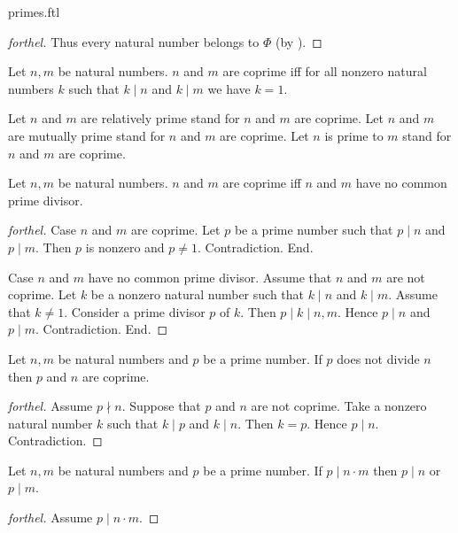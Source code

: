 \documentclass{naproche-library}
\begin{document}
\begin{smodule}{primes.ftl}
\begin{proof}[forthel]
    Thus every natural number belongs to $\Phi$ (by ).
  \end{proof}

  \begin{definition}[forthel,id=ARITHMETIC_10_463197419077632,printid]
    Let $n, m$ be natural numbers.
    $n$ and $m$ are coprime iff for all nonzero natural numbers $k$ such that $k \mid n$ and $k \mid m$ we have $k = 1$.

    Let $n$ and $m$ are relatively prime stand for $n$ and $m$ are coprime.
    Let $n$ and $m$ are mutually prime stand for $n$ and $m$ are coprime.
    Let $n$ is prime to $m$ stand for $n$ and $m$ are coprime.
  \end{definition}

  \begin{proposition}[forthel,id=ARITHMETIC_10_5776394594287616,printid]
    Let $n, m$ be natural numbers.
    $n$ and $m$ are coprime iff $n$ and $m$ have no common prime divisor.
  \end{proposition}
  \begin{proof}[forthel]
    Case $n$ and $m$ are coprime.
      Let $p$ be a prime number such that $p \mid n$ and $p \mid m$.
      Then $p$ is nonzero and $p \neq 1$.
      Contradiction.
    End.

    Case $n$ and $m$ have no common prime divisor.
      Assume that $n$ and $m$ are not coprime.
      Let $k$ be a nonzero natural number such that $k \mid n$ and $k \mid m$.
      Assume that $k \neq 1$.
      Consider a prime divisor $p$ of $k$.
      Then $p \mid k \mid n,m$.
      Hence $p \mid n$ and $p \mid m$.
      Contradiction.
    End.
  \end{proof}

  \begin{proposition}[forthel,id=ARITHMETIC_10_7212152851005440,printid]
    Let $n, m$ be natural numbers and $p$ be a prime number.
    If $p$ does not divide $n$ then $p$ and $n$ are coprime.
  \end{proposition}
  \begin{proof}[forthel]
    Assume $p \nmid n$.
    Suppose that $p$ and $n$ are not coprime.
    Take a nonzero natural number $k$ such that $k \mid p$ and $k \mid n$.
    Then $k = p$.
    Hence $p \mid n$.
    Contradiction.
  \end{proof}

  \begin{proposition}[forthel,id=ARITHMETIC_10_8313676557713408,printid]
    Let $n, m$ be natural numbers and $p$ be a prime number.
    If $p \mid n \cdot m$ then $p \mid n$ or $p \mid m$.
  \end{proposition}
  \begin{proof}[forthel]
    Assume $p \mid n \cdot m$.


\end{proof}
\end{smodule}
\end{document}
